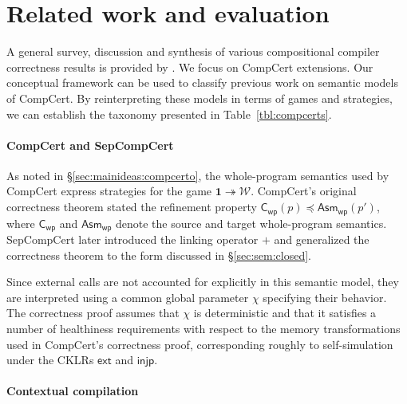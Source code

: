 \documentclass[acmsmall,screen,review,anonymous]{acmart}
\newcommand{\kw}[1]{\ensuremath{ \mathsf{#1} }}
\newcommand{\refby}{\preceq}
\begin{document}


\section{Related work and evaluation} \label{sec:rw} %

A general survey,
discussion and synthesis of various
compositional compiler correctness results
is provided by \citet{next700}.
We focus on CompCert extensions.
Our conceptual framework
can be used to classify previous work
on semantic models of CompCert.
By reinterpreting these models
in terms of games and strategies,
we can establish the taxonomy presented in
Table~\ref{tbl:compcerts}.

\paragraph{CompCert and SepCompCert} %

As noted in \S\ref{sec:mainideas:compcerto},
the whole-program semantics used by CompCert
express strategies for the game
$\mathbf{1} \twoheadrightarrow \mathcal{W}$.
CompCert's original correctness theorem
stated the refinement property
$\kw{C}_\kw{wp}(p) \refby \kw{Asm}_\kw{wp}(p')$,
where $\kw{C}_\kw{wp}$ and $\kw{Asm}_\kw{wp}$
denote the source and target whole-program semantics.
SepCompCert \cite{sepcompcert}
later introduced the linking operator $+$
and generalized the correctness theorem to
the form discussed in \S\ref{sec:sem:closed}.

Since external calls are not accounted for explicitly
in this semantic model,
they are interpreted %
using a common global parameter $\chi$
specifying their behavior.
The correctness proof assumes that $\chi$ is deterministic
and that it satisfies a number of healthiness requirements
with respect to the memory transformations
used in CompCert's correctness proof,
corresponding roughly to self-simulation
under the CKLRs $\kw{ext}$ and $\kw{injp}$.


\paragraph{Contextual compilation} %
\end{document}
